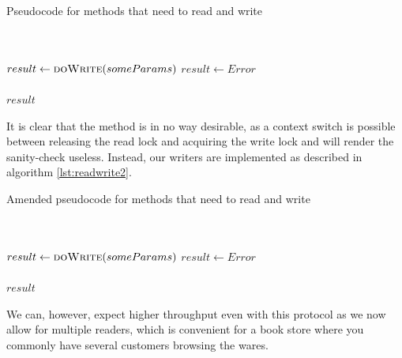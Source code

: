 \documentclass[11pt]{article}
\begin{document}
\begin{algorithm}
\caption{Pseudocode for methods that need to read and write}
\label{lst:readwrite}
\begin{algorithmic}
\\
\hspace{0.58cm}
\\
\hspace{1.16cm}
\hspace{1.16cm}
    \State $result\gets \Call{doWrite}{someParams}$
\Else
    \State $result\gets Error$
\EndIf\\
\hspace{0.58cm}\\
\hspace{0.58cm}\Return $result$
\EndFunction
\end{algorithmic}
\end{algorithm}

It is clear that the method is in no way desirable, as a context switch is 
possible between releasing the read lock and acquiring the write lock and
will render the sanity-check useless.
Instead, our writers are implemented as described in algorithm
\ref{lst:readwrite2}.\\

\begin{algorithm}
\caption{Amended pseudocode for methods that need to read and write}
\label{lst:readwrite2}
\begin{algorithmic}
\\
\hspace{0.58cm}
\\
    \State $result\gets \Call{doWrite}{someParams}$
\Else
    \State $result\gets Error$
\EndIf\\
\hspace{0.58cm}\\
\hspace{0.58cm}\Return $result$
\EndFunction
\end{algorithmic}
\end{algorithm}

We can, however, expect higher throughput even with this protocol as we now
allow for multiple readers, which is convenient for a book store where you
commonly have several customers browsing the wares.
\end{document}
